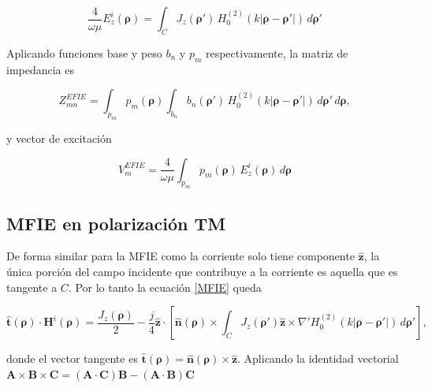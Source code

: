 \documentclass[11pt,a4paper,twoside,pdf]{article}
\numberwithin{equation}{section}
\begin{document}
\begin{equation}
\frac{4}{\omega \mu}
E_z^i(\boldsymbol{\rho})
=
\int_C
J_z(\boldsymbol{\rho}')
\, H_0^{(2)}\!\left( k \lvert \boldsymbol{\rho} - \boldsymbol{\rho}' \rvert \right)
\, d\boldsymbol{\rho}'
\end{equation}




Aplicando funciones base y peso $b_n$ y  $p_m$ respectivamente, la matriz de impedancia es

\begin{equation}
Z^{EFIE}_{mn}
=
\int_{p_m}
p_m(\boldsymbol{\rho})
\int_{b_n}
b_n(\boldsymbol{\rho}')
\, H_0^{(2)}\!\left( k \lvert \boldsymbol{\rho} - \boldsymbol{\rho}' \rvert \right)
\, d\boldsymbol{\rho}'
\, d\boldsymbol{\rho},
\label{ZEFIE}
\end{equation}

y vector de excitación

\begin{equation}
V^{EFIE}_m
=
\frac{4}{\omega \mu}
\int_{p_m}
p_m(\boldsymbol{\rho})
\, E_z^i(\boldsymbol{\rho})
\, d\boldsymbol{\rho}
\label{VmEFIE}
\end{equation}

\subsection{MFIE en polarización TM}

De forma similar para la MFIE como la corriente solo tiene componente $\boldsymbol{\hat{z}}$, la única porción del campo incidente que contribuye a la corriente es aquella que es tangente a $C$. Por lo tanto la ecuación \ref{MFIE} queda

\begin{equation}
\hat{\mathbf{t}}(\boldsymbol{\rho}) \cdot \mathbf{H}^i(\boldsymbol{\rho})
=
\frac{J_z(\boldsymbol{\rho})}{2}
-
\frac{j}{4}
\hat{\mathbf{z}} \cdot
\left[
\hat{\mathbf{n}}(\boldsymbol{\rho}) \times
\int_{C}
J_z(\boldsymbol{\rho}')
\hat{\mathbf{z}} \times
\nabla' H_0^{(2)}\!\left( k \lvert \boldsymbol{\rho} - \boldsymbol{\rho}' \rvert \right)
\, d\boldsymbol{\rho}'
\right],
\label{MFIEtan}
\end{equation}

donde el vector tangente es
$\hat{\mathbf{t}}(\boldsymbol{\rho}) = \hat{\mathbf{n}}(\boldsymbol{\rho}) \times \hat{\mathbf{z}}$.
Aplicando la identidad vectorial $\mathbf{A} \times \mathbf{B} \times \mathbf{C}
=
(\mathbf{A} \cdot \mathbf{C}) \mathbf{B}
-
(\mathbf{A} \cdot \mathbf{B}) \mathbf{C}$ 
\end{document}
